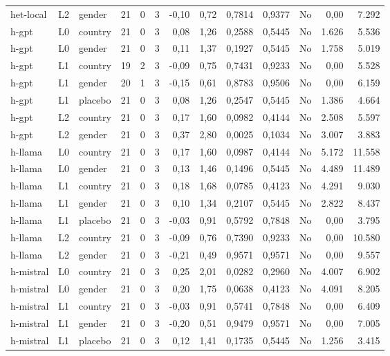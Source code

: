 \begin{landscape}
\begin{longtable}{lllrrrrrrrlrr}
het-local & L2 & gender & 21 & 0 & 3 & -0,10 & 0,72 & 0,7814 & 0,9377 & No & 0,00 & 7.292 \\
h-gpt & L0 & country & 21 & 0 & 3 & 0,08 & 1,26 & 0,2588 & 0,5445 & No & 1.626 & 5.536 \\
h-gpt & L0 & gender & 21 & 0 & 3 & 0,11 & 1,37 & 0,1927 & 0,5445 & No & 1.758 & 5.019 \\
h-gpt & L1 & country & 19 & 2 & 3 & -0,09 & 0,75 & 0,7431 & 0,9233 & No & 0,00 & 5.528 \\
h-gpt & L1 & gender & 20 & 1 & 3 & -0,15 & 0,61 & 0,8783 & 0,9506 & No & 0,00 & 6.159 \\
h-gpt & L1 & placebo & 21 & 0 & 3 & 0,08 & 1,26 & 0,2547 & 0,5445 & No & 1.386 & 4.664 \\
h-gpt & L2 & country & 21 & 0 & 3 & 0,17 & 1,60 & 0,0982 & 0,4144 & No & 2.508 & 5.597 \\
h-gpt & L2 & gender & 21 & 0 & 3 & 0,37 & 2,80 & 0,0025 & 0,1034 & No & 3.007 & 3.883 \\
h-llama & L0 & country & 21 & 0 & 3 & 0,17 & 1,60 & 0,0987 & 0,4144 & No & 5.172 & 11.558 \\
h-llama & L0 & gender & 21 & 0 & 3 & 0,13 & 1,46 & 0,1496 & 0,5445 & No & 4.489 & 11.489 \\
h-llama & L1 & country & 21 & 0 & 3 & 0,18 & 1,68 & 0,0785 & 0,4123 & No & 4.291 & 9.030 \\
h-llama & L1 & gender & 21 & 0 & 3 & 0,10 & 1,34 & 0,2107 & 0,5445 & No & 2.822 & 8.437 \\
h-llama & L1 & placebo & 21 & 0 & 3 & -0,03 & 0,91 & 0,5792 & 0,7848 & No & 0,00 & 3.795 \\
h-llama & L2 & country & 21 & 0 & 3 & -0,09 & 0,76 & 0,7390 & 0,9233 & No & 0,00 & 10.580 \\
h-llama & L2 & gender & 21 & 0 & 3 & -0,21 & 0,49 & 0,9571 & 0,9571 & No & 0,00 & 9.557 \\
h-mistral & L0 & country & 21 & 0 & 3 & 0,25 & 2,01 & 0,0282 & 0,2960 & No & 4.007 & 6.902 \\
h-mistral & L0 & gender & 21 & 0 & 3 & 0,20 & 1,75 & 0,0638 & 0,4123 & No & 4.091 & 8.205 \\
h-mistral & L1 & country & 21 & 0 & 3 & -0,03 & 0,91 & 0,5741 & 0,7848 & No & 0,00 & 6.409 \\
h-mistral & L1 & gender & 21 & 0 & 3 & -0,20 & 0,51 & 0,9479 & 0,9571 & No & 0,00 & 7.005 \\
h-mistral & L1 & placebo & 21 & 0 & 3 & 0,12 & 1,41 & 0,1735 & 0,5445 & No & 1.256 & 3.415 \\

\end{longtable}
\end{landscape}
